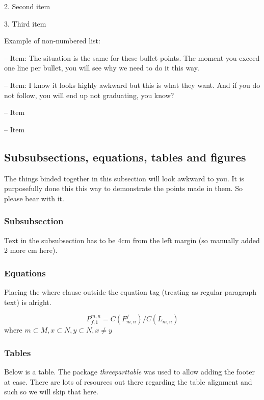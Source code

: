 2. Second item

3. Third item


Example of non-numbered list:

-- Item: The situation is the same for these bullet points. The moment you exceed one line per bullet, you will see why we need to do it this way.

-- Item: I know it looks highly awkward but this is what they want. And if you do not follow, you will end up not graduating, you know?

-- Item

-- Item

\newpage %
\subsection{Subsubsections, equations, tables and figures}
The things binded together in this subsection will look awkward to you.
It is purposefully done this this way to demonstrate the points made in them. So please bear with it.

\subsubsection{Subsubsection}
\hspace{2cm}Text in the subsubsection has to be 4cm from the left margin (so manually added 2 more cm here).

\subsubsection{Equations}
\hspace{2cm}Placing the where clause outside the equation tag (treating as regular paragraph text) is alright.

\begin{equation} \label{eq}
P_{f,1}^{m,n} = C(F_{m,n}^f) / C(L_{m,n})
\end{equation}
where $m \subset M, x \subset N, y \subset N, x \neq y$

\vspace{4.7ex} %
\subsubsection{Tables}
\hspace{2cm}Below is a table. The package \textit{threeparttable} was used to allow adding the footer at ease.
There are lots of resources out there regarding the table alignment and such so we will skip that here.

